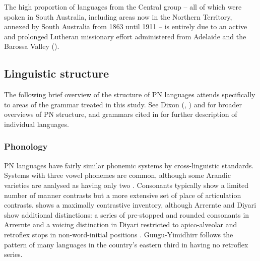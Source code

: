 The high proportion of languages from the Central group – all of which were spoken in South Australia, including areas now in the Northern Territory, annexed by South Australia from 1863 until 1911 – is entirely due to an active and prolonged Lutheran missionary effort administered from Adelaide and the Barossa Valley ().

\subsection{Linguistic structure}
\label{sec:key:1.2.1}

The following brief overview of the structure of PN languages attends specifically to areas of the grammar treated in this study. See Dixon (\citeyear{dixon_languages_1980}, \citeyear{dixon_australian_2002}) and \citet{koch_historical_2014} for broader overviews of PN structure, and grammars cited in  for further description of individual languages.

\subsubsection{Phonology}
\label{sec:key:1.2.1.1}

PN languages have fairly similar phonemic systems by cross-linguistic standards. Systems with three vowel phonemes are common, although some Arandic varieties are analysed as having only two \citep{breen_wonders_2001}. Consonants typically show a limited number of manner contrasts but a more extensive set of place of articulation contrasts.  shows a maximally contrastive inventory, although Arrernte and Diyari show additional distinctions: a series of pre-stopped and rounded consonants in Arrernte \citep{breen_wonders_2001} and a voicing distinction in Diyari restricted to apico-alveolar and retroflex stops in non-word-initial positions \citep[13]{austin_grammar_2013}. Guugu{\hyp}Yimidhirr follows the pattern of many languages in the country’s eastern third in having no retroflex series.

\begin{table}\footnotesize
{}
    \caption{The inventory of consonant phonemes common to many PN languages.}
    \label{tab:chap1:consonantphonemes}
\end{table}

